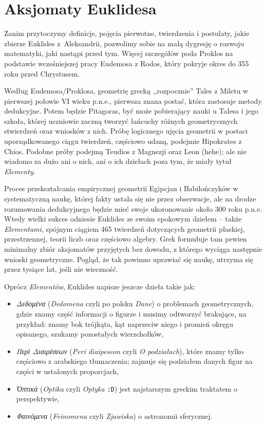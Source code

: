 %

\section{Aksjomaty Euklidesa}

Zanim przytoczymy definicje, pojęcia pierwotne, twierdzenia i postulaty, jakie zbierze Euklides z~Aleksandrii, pozwolimy sobie na małą dygresję o rozwoju matematyki, jaki nastąpi przed tym.
Więcej szczegółów poda Proklos na podstawie wcześniejszej pracy Eudemosa z Rodos, który pokryje okres do 355 roku przed Chrystusem.
%
%

Według Eudemosa/Proklosa, geometrię grecką ,,rozpocznie'' Tales z Miletu w pierwszej połowie VI wieku p.n.e., pierwsza znana postać, która zastosuje metody dedukcyjne.
%
Potem będzie Pitagoras, być może pobierający nauki u Talesa i jego szkoła, której uczniowie zaczną tworzyć łańcuchy różnych geometrycznych stwierdzeń oraz wniosków z nich. 
%
Próbę logicznego ujęcia geometrii w postaci uporządkowanego ciągu twierdzeń, częściowo udaną, podejmie Hipokrates z Chios.
%
Podobne próby podejmą Teudios z Magnezji oraz Leon (hehe); ale nie wiadomo za dużo ani o nich, ani o ich dziełach poza tym, że miały tytuł \emph{Elementy}.
%
%

Proces przekształcania empirycznej geometrii Egipcjan i Babilończyków w systematyczną naukę, której fakty ustala się nie przez obserwacje, ale na drodze rozumowania dedukcyjnego będzie mieć swoje ukoronowanie około 300 roku p.n.e.
Wtedy wielki sukces odniesie Euklides ze swoim epokowym dziełem -- także \emph{Elementami}, spójnym ciągiem 465 twierdzeń dotyczących geometrii płaskiej, przestrzennej, teorii liczb oraz częściowo algebry.
Grek formułuje tam pewien minimalny zbiór aksjomatów przyjętych bez dowodu, z którego wyciąga następnie wnioski geometryczne.
Pogląd, że tak powinno uprawiać się naukę, utrzyma się przez tysiące lat, jeśli nie wieczność.

Oprócz \emph{Elementów}, Euklides napisze jeszcze dzieła takie jak:
\begin{itemize}
    \item \emph{Δεδομένα} (\emph{Dedomena} czyli po polsku \emph{Dane}) o problemach geometrycznych, gdzie znamy część informacji o figurze i musimy odtworzyć brakujące, na przykład: znamy bok trójkąta, kąt naprzeciw niego i promień okręgu opisanego, szukamy pozostałych wierzchołków,
    \item \emph{Περὶ Διαιρέσεων} (\emph{Peri diaipeseon} czyli \emph{O podziałach}), które znamy tylko częściowo z arabskiego tłumaczenia; zajmuje się podziałem danych figur na części w ustalonych proporcjach,
    \item \emph{Ὀπτικά} (\emph{Optika} czyli \emph{Optyka} \texttt{:D}) jest najstarszym greckim traktatem o perspektywie,
    \item \emph{Φαινόμενα} (\emph{Feinomena} czyli \emph{Zjawiska}) o astronomii sferycznej.
\end{itemize}


